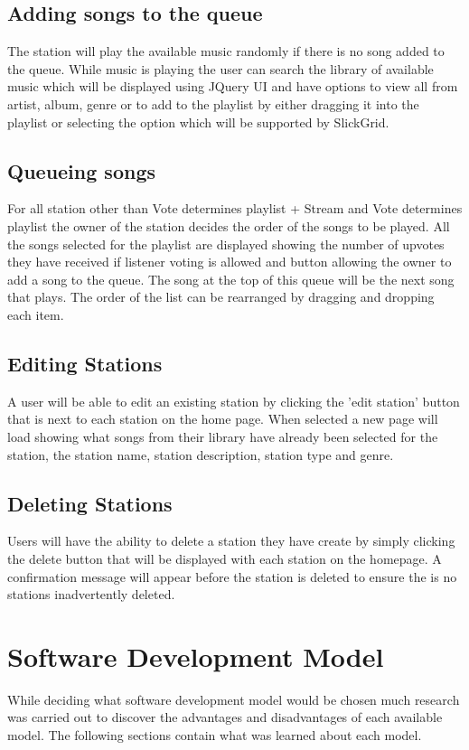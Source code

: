 \documentclass[a4paper, 12pt]{report}
\begin{document}
\subsection{Adding songs to the queue}
The station will play the available music randomly if there is no song added to the queue. While music is playing the user can search the library of available music which will be displayed using JQuery UI and have options to view all from artist, album, genre or to add to the playlist by either dragging it into the playlist or selecting the option which will be supported by SlickGrid.
 
\subsection{Queueing songs}
For all station other than Vote determines playlist + Stream and Vote determines playlist the owner of the station decides the order of the songs to be played. All the songs selected for the playlist are displayed showing the number of upvotes they have received if listener voting is allowed and button allowing the owner to add a song to the queue. The song at the top of this queue will be the next song that plays. The order of the list can be rearranged by dragging and dropping each item. 

\subsection{Editing Stations}
A user will be able to edit an existing station by clicking the 'edit station' button that is next to each station on the home page. When selected a new page will load showing what songs from their library have already been selected for the station, the station name, station description, station type and genre. 

\subsection{Deleting Stations}
Users will have the ability to delete a station they have create by simply clicking the delete button that will be displayed with each station on the homepage. A confirmation message will appear before the station is deleted to ensure the is no stations inadvertently deleted.

\section{Software Development Model}
While deciding what software development model would be chosen much research was carried out to discover the advantages and disadvantages of each available model. The following sections contain what was learned about each model.
\end{document}

